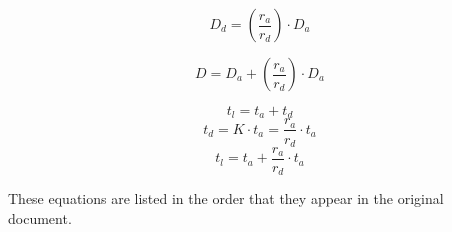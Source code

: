 \documentclass[useAMS,usenatbib]{mn2e}
\begin{document}
\begin{equation}
D_{d} = (\frac{r_{a}}{r_{d}}) \cdot D_{a}
\end{equation}

\begin{equation}
D = D_{a} + (\frac{r_{a}}{r_{d}}) \cdot D_{a}
\end{equation}

\begin{equation}
t_{l} = t_{a} + t_{d}
\end{equation}
\begin{equation}
t_{d} = K \cdot t_{a} = \frac{r_{a}}{r_{d}} \cdot t_{a}
\end{equation}
\begin{equation}
t_{l} = t_{a} + \frac{r_{a}}{r_{d}} \cdot t_{a}
\end{equation}

These equations are listed in the order that they appear in the original document.

\end{document}
